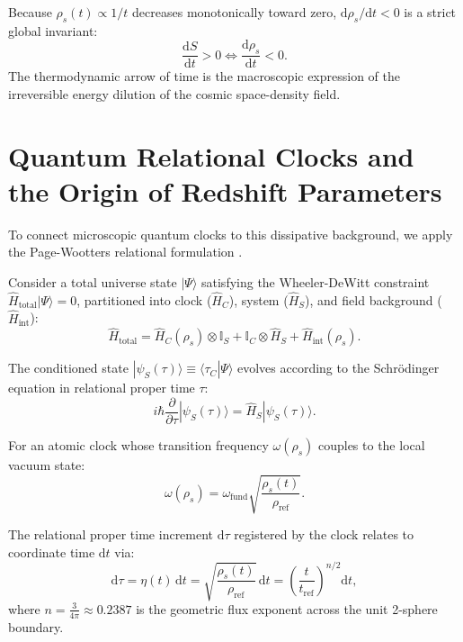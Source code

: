 \documentclass[aps,prd,reprint,superscriptaddress,nofootinbib,floatfix,amsmath,amssymb]{revtex4-2}
\begin{document}
Because $\rho_s(t) \propto 1/t$ decreases monotonically toward zero, $\mathrm{d}\rho_s/\mathrm{d}t < 0$ is a strict global invariant:
\begin{equation}
\frac{\mathrm{d}S}{\mathrm{d}t} > 0 \iff \frac{\mathrm{d}\rho_s}{\mathrm{d}t} < 0.
\label{eq:arrow_of_time}
\end{equation}
The thermodynamic arrow of time is the macroscopic expression of the irreversible energy dilution of the cosmic space-density field.

\section{Quantum Relational Clocks and the Origin of Redshift Parameters}
\label{sec:quantum_clocks}

To connect microscopic quantum clocks to this dissipative background, we apply the Page-Wootters relational formulation \cite{PageWootters1983}.

Consider a total universe state $|\Psi\rangle$ satisfying the Wheeler-DeWitt constraint $\hat{H}_{\text{total}}|\Psi\rangle = 0$, partitioned into clock ($\hat{H}_C$), system ($\hat{H}_S$), and field background ($\hat{H}_{\text{int}}$):
\begin{equation}
\hat{H}_{\text{total}} = \hat{H}_C(\rho_s) \otimes \mathbb{I}_S + \mathbb{I}_C \otimes \hat{H}_S + \hat{H}_{\text{int}}(\rho_s).
\label{eq:partitioned_h}
\end{equation}

The conditioned state $|\psi_S(\tau)\rangle \equiv \langle \tau_C | \Psi \rangle$ evolves according to the Schrödinger equation in relational proper time $\tau$:
\begin{equation}
i\hbar \frac{\partial}{\partial \tau} |\psi_S(\tau)\rangle = \hat{H}_S |\psi_S(\tau)\rangle.
\label{eq:schrodinger_proper}
\end{equation}

For an atomic clock whose transition frequency $\omega(\rho_s)$ couples to the local vacuum state:
\begin{equation}
\omega(\rho_s) = \omega_{\text{fund}} \sqrt{\frac{\rho_s(t)}{\rho_{\text{ref}}}}.
\label{eq:atomic_freq_scaling}
\end{equation}

The relational proper time increment $\mathrm{d}\tau$ registered by the clock relates to coordinate time $\mathrm{d}t$ via:
\begin{equation}
\mathrm{d}\tau = \eta(t) \, \mathrm{d}t = \sqrt{\frac{\rho_s(t)}{\rho_{\text{ref}}}} \, \mathrm{d}t = \left( \frac{t}{t_{\text{ref}}} \right)^{n/2} \mathrm{d}t,
\label{eq:dtau_def}
\end{equation}
where $n = \frac{3}{4\pi} \approx 0.2387$ is the geometric flux exponent across the unit 2-sphere boundary.
\end{document}

